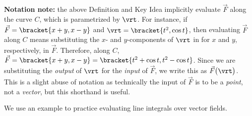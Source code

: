 \textbf{Notation note:} the above Definition and Key Idea implicitly evaluate $\vec F$ along the curve $C$, which is parametrized by $\vrt$. For instance, if $\vec F =\bracket{x+y,x-y}$ and $\vrt =\bracket{t^2,\cos t}$, then evaluating $\vec F$ along $C$ means substituting the $x$- and $y$-components of $\vrt$ in for $x$ and $y$, respectively, in $\vec F$. Therefore, along $C$, $\vec F =\bracket{x+y,x-y}=\bracket{t^2+\cos t,t^2-\cos t}$. Since we are substituting the \emph{output} of $\vrt$ for the \emph{input} of $\vec F$, we write this as $\vec F\big(\vrt\big)$. This is a slight abuse of notation as technically the input of $\vec F$ is to be a \emph{point}, not a \emph{vector}, but this shorthand is useful.

We use an example to practice evaluating line integrals over vector fields.


